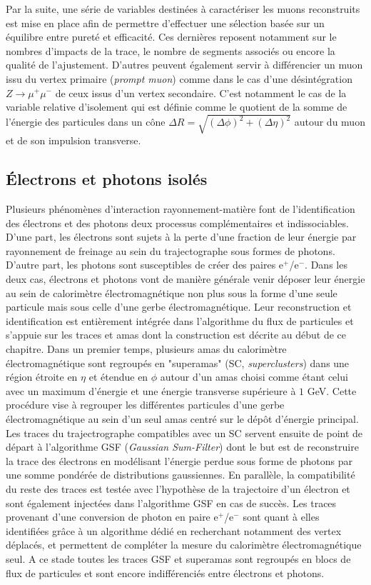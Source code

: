 Par la suite, une série de variables destinées à caractériser les muons reconstruits est mise en place afin de permettre d'effectuer une sélection basée sur un équilibre entre pureté et efficacité. Ces dernières reposent notamment sur le nombres d'impacts de la trace, le nombre de segments associés ou encore la qualité de l'ajustement. D'autres peuvent également servir à différencier un muon issu du vertex primaire (\textit{prompt muon}) comme dans le cas d'une désintégration $Z\rightarrow\mu^+\mu^-$ de ceux issus d'un vertex secondaire. C'est notamment le cas de la variable relative d'isolement qui est définie comme le quotient de la somme de l'énergie des particules dans un cône $\Delta R=\sqrt{(\Delta\phi)^2+(\Delta\eta)^2}$ autour du muon et de son impulsion transverse.

\subsection{Électrons et photons isolés}
\label{EGammaID}

Plusieurs phénomènes d'interaction rayonnement-matière font de l'identification des électrons et des photons deux processus complémentaires et indissociables. D'une part, les électrons sont sujets à la perte d'une fraction de leur énergie par rayonnement de freinage au sein du trajectographe sous formes de photons. D'autre part, les photons sont susceptibles de créer des paires e$^+$/e$^-$. Dans les deux cas, électrons et photons vont de manière générale venir déposer leur énergie au sein de calorimètre électromagnétique non plus sous la forme d'une seule particule mais sous celle d'une gerbe électromagnétique. Leur reconstruction et identification est entièrement intégrée dans l'algorithme du flux de particules et s'appuie sur les traces et amas dont la construction est décrite au début de ce chapitre. Dans un premier temps, plusieurs amas du calorimètre électromagnétique sont regroupés en "superamas" (SC, \textit{superclusters}) dans une région étroite en $\eta$ et étendue en $\phi$ autour d'un amas choisi comme étant celui avec un maximum d'énergie et une énergie transverse supérieure à $1$ GeV. Cette procédure vise à regrouper les différentes particules d'une gerbe électromagnétique au sein d'un seul amas centré sur le dépôt d'énergie principal. Les traces du trajectrographe compatibles avec un SC servent ensuite de point de départ à l'algorithme GSF (\textit{Gaussian Sum-Filter}) \cite{Adam_2005} dont le but est de reconstruire la trace des électrons en modélisant l'énergie perdue sous forme de photons par une somme pondérée de distributions gaussiennes. En parallèle, la compatibilité du reste des traces est testée avec l'hypothèse de la trajectoire d'un électron et sont également injectées dans l'algorithme GSF en cas de succès. Les traces provenant d'une conversion de photon en paire e$^+$/e$^-$ sont quant à elles identifiées grâce à un algorithme dédié en recherchant notamment des vertex déplacés, et permettent de compléter la mesure du calorimètre électromagnétique seul. A ce stade toutes les traces GSF et superamas sont regroupés en blocs de flux de particules et sont encore indifférenciés entre électrons et photons. \\

